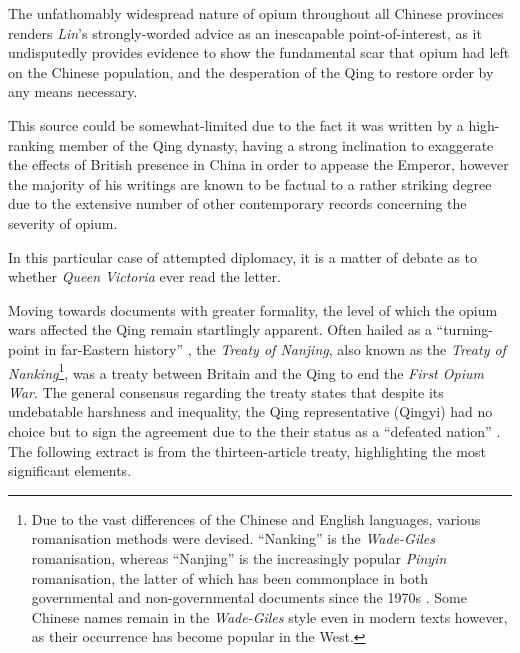 \documentclass[a4paper,oneside]{article}
\begin{document}
        The unfathomably widespread nature of opium throughout all Chinese provinces renders \textit{Lin}'s strongly-worded advice as an inescapable point-of-interest, as it undisputedly provides evidence to show the fundamental scar that opium had left on the Chinese population, and the desperation of the Qing to restore order by any means necessary.

        This source could be somewhat-limited due to the fact it was written by a high-ranking member of the Qing dynasty, having a strong inclination to exaggerate the effects of British presence in China in order to appease the Emperor, however the majority of his writings are known to be factual to a rather striking degree due to the extensive number of other contemporary records concerning the severity of opium.

        In this particular case of attempted diplomacy, it is a matter of debate as to whether \textit{Queen Victoria} ever read the letter.

        Moving towards documents with greater formality, the level of which the opium wars affected the Qing remain startlingly apparent. Often hailed as a ``turning-point in far-Eastern history'' \autocite{Fairbank:1940}, the \textit{Treaty of Nanjing}, also known as the \textit{Treaty of Nanking}\footnote{Due to the vast differences of the Chinese and English languages, various romanisation methods were devised. ``Nanking'' is the \textit{Wade-Giles} romanisation, whereas ``Nanjing'' is the increasingly popular \textit{Pinyin} romanisation, the latter of which has been commonplace in both governmental and non-governmental documents since the 1970s \autocite{Tao:1991}. Some Chinese names remain in the \textit{Wade-Giles} style even in modern texts however, as their occurrence has become popular in the West.}, was a treaty between Britain and the Qing to end the \textit{First Opium War}. The general consensus regarding the treaty states that despite its undebatable harshness and inequality, the Qing representative (Qingyi) had no choice but to sign the agreement due to the their status as a ``defeated nation''
\autocite{Mao:2018}. The following extract is from the thirteen-article treaty, highlighting the most significant elements.

\end{document}
